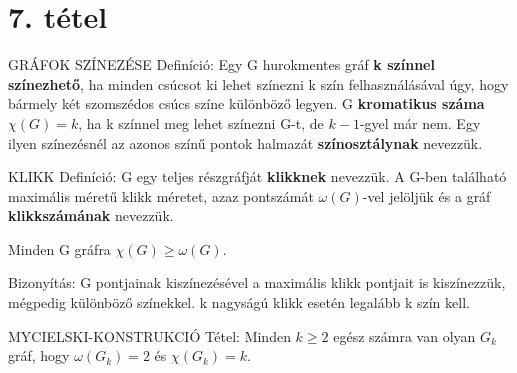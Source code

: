 \section{7. tétel}

\begin{shaded}
GRÁFOK SZÍNEZÉSE Definíció: Egy G hurokmentes gráf \textbf{k színnel színezhető}, ha minden csúcsot ki lehet színezni k szín felhasználásával úgy, hogy bármely két szomszédos csúcs színe különböző legyen. G \textbf{kromatikus száma} $\chi(G) = k$, ha k színnel meg lehet színezni G-t, de $k - 1$-gyel már nem. Egy ilyen színezésnél az azonos színű pontok halmazát \textbf{színosztálynak} nevezzük.
\end{shaded}
\begin{shaded}
KLIKK Definíció: G egy teljes részgráfját \textbf{klikknek} nevezzük. A G-ben található maximális méretű klikk méretet, azaz pontszámát $\omega(G)$-vel jelöljük és a gráf \textbf{klikkszámának} nevezzük.
\end{shaded}
\begin{framed}
Minden G gráfra $\chi(G) \geq \omega(G)$.
\end{framed}
\begin{leftbar}
Bizonyítás: G pontjainak kiszínezésével a maximális klikk pontjait is kiszínezzük, mégpedig különböző színekkel. k nagyságú klikk esetén legalább k szín kell.
\end{leftbar}
\begin{framed}
MYCIELSKI-KONSTRUKCIÓ Tétel: Minden $k \geq 2$ egész számra van olyan $G_k$ gráf, hogy $\omega(G_k) = 2$ és $\chi(G_k) = k$.
\end{framed}
